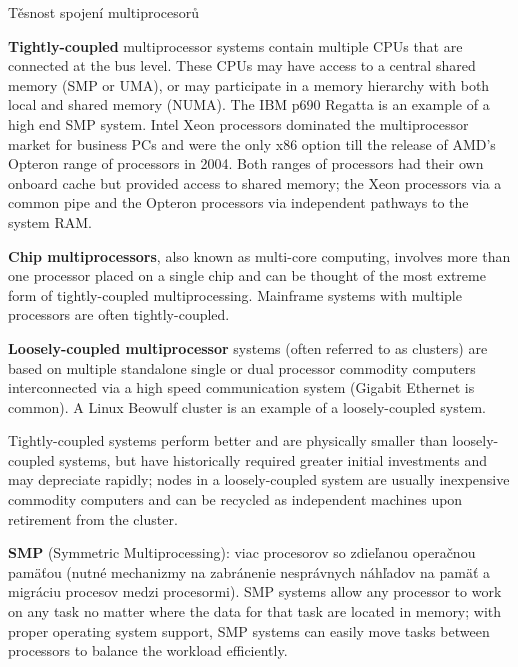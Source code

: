 \begin{obecne}{Těsnost spojení multiprocesorů}
\begin{pitemize}
    \item \textbf{Tightly-coupled} multiprocessor systems contain multiple CPUs that are connected at the bus level. These CPUs may have access to a central shared memory (SMP or UMA), or may participate in a memory hierarchy with both local and shared memory (NUMA). The IBM p690 Regatta is an example of a high end SMP system. Intel Xeon processors dominated the multiprocessor market for business PCs and were the only x86 option till the release of AMD's Opteron range of processors in 2004. Both ranges of processors had their own onboard cache but provided access to shared memory; the Xeon processors via a common pipe and the Opteron processors via independent pathways to the system RAM.

    \item \textbf{Chip multiprocessors}, also known as multi-core computing, involves more than one processor placed on a single chip and can be thought of the most extreme form of tightly-coupled multiprocessing. Mainframe systems with multiple processors are often tightly-coupled.

    \item \textbf{Loosely-coupled multiprocessor} systems (often referred to as clusters) are based on multiple standalone single or dual processor commodity computers interconnected via a high speed communication system (Gigabit Ethernet is common). A Linux Beowulf cluster is an example of a loosely-coupled system.
\end{pitemize}
Tightly-coupled systems perform better and are physically smaller than loosely-coupled systems, but have historically required greater initial investments and may depreciate rapidly; nodes in a loosely-coupled system are usually inexpensive commodity computers and can be recycled as independent machines upon retirement from the cluster.

\textbf{SMP} (Symmetric Multiprocessing): viac procesorov so zdieľanou operačnou pamäťou (nutné mechanizmy na zabránenie nesprávnych náhľadov na pamäť a migráciu procesov medzi procesormi). SMP systems allow any processor to work on any task no matter where the data for that task are located in memory; with proper operating system support, SMP systems can easily move tasks between processors to balance the workload efficiently.
\end{obecne}
